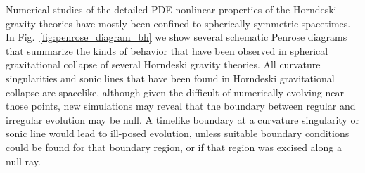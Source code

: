 \documentclass{ws-ijmpd}
\begin{document}
Numerical studies of the detailed PDE nonlinear
properties of the Horndeski
gravity theories have mostly been confined to spherically
symmetric spacetimes.
In Fig.~\ref{fig:penrose_diagram_bh} we show 
several schematic Penrose diagrams that summarize the 
kinds of behavior that have been observed in spherical
gravitational collapse of several Horndeski gravity theories.
All curvature singularities and sonic lines that have
been found in Horndeski gravitational collapse are spacelike, 
although given the difficult of numerically evolving near those
points, new simulations may reveal that the boundary between
regular and irregular evolution may be null. 
A timelike boundary at a curvature singularity or sonic line
would lead to ill-posed evolution, unless suitable boundary
conditions could be found for that boundary region, or
if that region was excised along a null ray.
\end{document}
